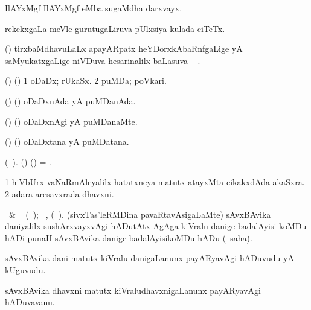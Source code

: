   IlAYxMgf IlAYxMgf eMba sugaMdha darxvayx. 
\eanum
\emng
\eentry

\bentry
{}
\gl{\saMkiSx} 
\bmng
{}
\emng
\eentry

\bentry
{} 
\gl{\nA} 
\bmng
rekekxgaLa meVle   gurutugaLiruva pUlxsiya kulada ciTeTx.
\emng
\eentry

\bentry
{} 
\gl{\uparx} 
\bmng
(\ravi) tirxbaMdhavuLaLx apayARpatx heYDorxkAbaRnfgaLige yA saMyukatxgaLige niVDuva hesarinalilx baLasuva \uparx\   \eng{)}.
\emng
\eentry

\bentry
{} 
\gl{\nA} 
\bmng
(\birx) (\ashi) 
\bnum
\num{1} oDaDx; rUkaSx. 
\num{2} puMDa; poVkari.
\enum
\emng
\eentry

\bentry
{} 
\gl{\gu} 
\bmng
(\birx) (\ashi) oDaDxnAda yA puMDanAda.
\emng
\eentry

\bentry
{} 
\gl{\kirxvi} 
\bmng
(\birx) (\ashi) oDaDxnAgi yA puMDanaMte.
\emng
\eentry

\bentry
{} 
\gl{\nA} 
\bmng
(\birx) (\ashi) oDaDxtana yA puMDatana.
\emng
\eentry

\bentry
{} 
\gl{\nA} 
\bmng
(\bava\ ). 
(\birx) (\ashi) = .
\emng
\eentry

\bentry
{} 
\gl{\nA} 
\bmng
\bnum
\num{1} hiVbUrx vaNaRmAleyalilx  hatatxneya matutx atayxMta cikakxdAda akaSxra. 
\num{2} adara aresavxrada dhavxni.
\enum
\emng
\eentry

\bentry
{} 
\gl{\sakirx} 
\bmng
\eng{[}\BU\ \& \BUkaq\  (\ame\ ); \vakaq\ , (\ame\ )\eng{]}. 
(sivxTas'leRMDina pavaRtavAsigaLaMte) sAvxBAvika daniyalilx sushArxvayxvAgi hADutAtx AgAga kiVralu danige badalAyisi koMDu hADi punaH sAvxBAvika danige badalAyisikoMDu hADu (\akirx\ saha).
\emng
\eentry

\bentry
{} 
\gl{\nA} 
\bmng
sAvxBAvika dani matutx kiVralu danigaLanunx payARyavAgi hADuvudu yA kUguvudu.
\emng
\eentry

\bentry
{} 
\gl{\nA} 
\bmng
sAvxBAvika dhavxni matutx kiVraludhavxnigaLanunx payARyavAgi hADuvavanu.
\emng
\eentry

